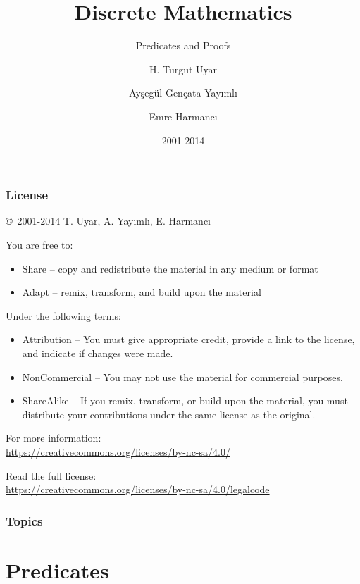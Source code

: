\documentclass[dvipsnames]{beamer}
\title{Discrete Mathematics}
\subtitle{Predicates and Proofs}
\author{H. Turgut Uyar \and Ayşegül Gençata Yayımlı \and Emre Harmancı}
\date{2001-2014}
\begin{document}
\begin{frame}
  \titlepage
\end{frame}

\begin{frame}
  \frametitle{License}

  \hfill
  \copyright~2001-2014 T. Uyar, A. Yayımlı, E. Harmancı

  \vfill
  \begin{footnotesize}
    You are free to:
    \begin{itemize}
      \itemsep0em
      \item Share -- copy and redistribute the material in any medium or format
      \item Adapt -- remix, transform, and build upon the material
    \end{itemize}

    Under the following terms:
    \begin{itemize}
      \itemsep0em
      \item Attribution -- You must give appropriate credit, provide a link to
        the license, and indicate if changes were made.

      \item NonCommercial -- You may not use the material for commercial
        purposes.

      \item ShareAlike -- If you remix, transform, or build upon the material,
        you must distribute your contributions under the same license as the
        original.
    \end{itemize}
  \end{footnotesize}

  \begin{small}
    For more information:\\
    \url{https://creativecommons.org/licenses/by-nc-sa/4.0/}

    \smallskip
    Read the full license:\\
    \url{https://creativecommons.org/licenses/by-nc-sa/4.0/legalcode}
  \end{small}
\end{frame}

\begin{frame}
  \frametitle{Topics}
  \tableofcontents
\end{frame}

\section{Predicates}
\end{document}
